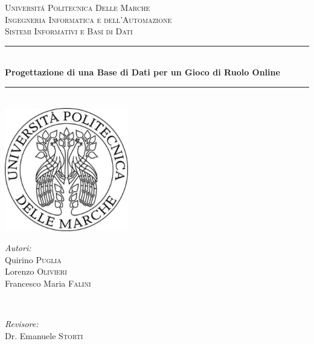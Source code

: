 
\begin{titlepage}

\newcommand{\HRule}{\rule{\linewidth}{0.5mm}} %

\center %

\textsc{\LARGE Universit\'{a} Politecnica Delle Marche}\\[1.5cm] %
\textsc{\Large Ingegneria Informatica e dell'Automazione}\\[0.5cm] %
\textsc{\large Sistemi Informativi e Basi di Dati}\\[0.5cm] %

\HRule \\[0.4cm]
{ \huge \bfseries Progettazione di una Base di Dati per un Gioco di Ruolo Online}\\[0.4cm] %
\HRule \\[1.5cm]

\includegraphics[width=54mm, height=54mm]{./immagini/logo}\\[1cm] %

\begin{minipage}{0.4\textwidth}
\begin{flushleft} \large
\emph{Autori:}\\
Quirino \textsc{Puglia}\\ %
Lorenzo \textsc{Olivieri}\\ %
Francesco Maria \textsc{Falini}\\ %
\end{flushleft}
\end{minipage}
~
\begin{minipage}{0.4\textwidth}
\begin{flushright} \large
\emph{Revisore:} \\
Dr. Emanuele \textsc{Storti} %
\end{flushright}
\end{minipage}\\[1.5cm]





\vfill %

\end{titlepage}